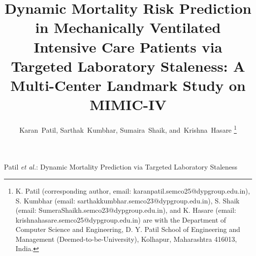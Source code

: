 \documentclass[journal]{IEEEtran}
\begin{document}
\title{Dynamic Mortality Risk Prediction in Mechanically Ventilated Intensive Care Patients via Targeted Laboratory Staleness: A Multi-Center Landmark Study on MIMIC-IV}

\author{Karan~Patil,
        Sarthak~Kumbhar,
        Sumaira~Shaik,
        and~Krishna~Hasare%
\thanks{K. Patil (corresponding author, email: karanpatil.semco25@dypgroup.edu.in), S. Kumbhar (email: sarthakkumbhar.semco23@dypgroup.edu.in), S. Shaik (email: SumeraShaikh.semco23@dypgroup.edu.in), and K. Hasare (email: krishnahasare.semco25@dypgroup.edu.in) are with the Department of Computer Science and Engineering, D. Y. Patil School of Engineering and Management (Deemed-to-be-University), Kolhapur, Maharashtra 416013, India.}%
}

%
{Patil \MakeLowercase{\textit{et al.}}: Dynamic Mortality Prediction via Targeted Laboratory Staleness}

\maketitle
\end{document}
